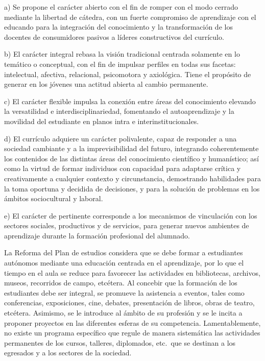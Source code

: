 \enlargethispage{1\baselineskip}
\begin{Obs}
\item[a)] Se propone el carácter abierto con el fin de romper con el modo cerrado
mediante la libertad de cátedra, con un fuerte compromiso de aprendizaje
con el educando para la integración del conocimiento y la transformación de
los docentes de consumidores pasivos a líderes constructivos del currículo.
\item[b)] El carácter integral rebasa la visión tradicional centrada solamente en
lo temático o conceptual, con el fin de impulsar perfiles en todas sus
facetas: intelectual, afectiva, relacional, psicomotora y axiológica. Tiene el
propósito de generar en los jóvenes una actitud abierta al cambio permanente. 
\item[c)] El carácter flexible impulsa la conexión entre áreas del conocimiento
elevando la versatilidad e interdisciplinariedad, fomentando el
autoaprendizaje y la movilidad del estudiante en planos intra e
interinstitucionales. 
\item[d)] El currículo adquiere un carácter polivalente, capaz de responder a una
sociedad cambiante y a la imprevisibilidad del futuro, integrando
coherentemente los contenidos de las distintas áreas del conocimiento
científico y humanístico; así como la virtud de formar individuos con
capacidad para adaptarse crítica y creativamente a cualquier contexto y
circunstancia, demostrando habilidades para la toma  oportuna
y decidida de decisiones, y para la solución de problemas en los ámbitos
sociocultural y laboral. 
\item[e)] El carácter de pertinente corresponde a los mecanismos de vinculación
con los sectores sociales, productivos y de servicios, para generar nuevos
ambientes de aprendizaje durante la formación profesional del alumnado. 
\end{Obs}

La Reforma del Plan de estudios considera que se debe formar a 
estudiantes autónomos mediante una educación centrada en el aprendizaje,
por lo que el tiempo en el aula se reduce para favorecer las actividades en
bibliotecas, archivos, museos, recorridos de campo, etcétera.  Al concebir
que la formación de los estudiantes debe ser integral, se promueve la
asistencia a eventos, tales como conferencias, exposiciones, cine, debates,
presentación de libros, obras de teatro, etcétera. Asimismo, se le
introduce al ámbito de su profesión y se le incita a proponer proyectos en
las diferentes esferas de su competencia. Lamentablemente, no existe un
programa específico que regule de manera sistemática las actividades permanentes
 de los cursos, talleres, diplomados, etc.\ que se destinan a los 
 egresados y a los sectores de la sociedad. 


